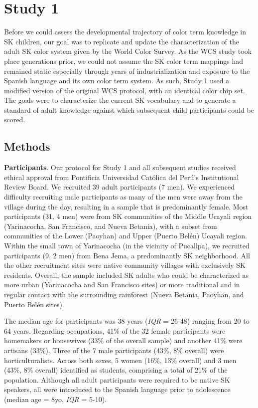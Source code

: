 \documentclass[
  english,
  ,man,floatsintext]{apa6}
\begin{document}
\hypertarget{study-1}{%
\section{Study 1}\label{study-1}}

Before we could assess the developmental trajectory of color term knowledge in SK children, our goal was to replicate and update the characterization of the adult SK color system given by the World Color Survey. As the WCS study took place generations prior, we could not assume the SK color term mappings had remained static especially through years of industrialization and exposure to the Spanish language and its own color term system. As such, Study 1 used a modified version of the original WCS protocol, with an identical color chip set. The goals were to characterize the current SK vocabulary and to generate a standard of adult knowledge against which subsequent child participants could be scored.

\hypertarget{methods}{%
\subsection{Methods}\label{methods}}

\textbf{Participants}. Our protocol for Study 1 and all subsequent studies received ethical approval from Pontificia Universidad Católica del Perú's Institutional Review Board. We recruited 39 adult participants (7 men). We experienced difficulty recruiting male participants as many of the men were away from the village during the day, resulting in a sample that is predominantly female. Most participants (31, 4 men) were from SK communities of the Middle Ucayali region (Yarinacocha, San Francisco, and Nueva Betania), with a subset from communities of the Lower (Paoyhan) and Upper (Puerto Belén) Ucayali region. Within the small town of Yarinacocha (in the vicinity of Pucallpa), we recruited participants (9, 2 men) from Bena Jema, a predominantly SK neighborhood. All the other recruitment sites were native community villages with exclusively SK residents. Overall, the sample included SK adults who could be characterized as more urban (Yarinacocha and San Francisco sites) or more traditional and in regular contact with the surrounding rainforest (Nueva Betania, Paoyhan, and Puerto Belén sites).

The median age for participants was 38 years (\emph{IQR} = 26-48) ranging from 20 to 64 years. Regarding occupations, 41\% of the 32 female participants were homemakers or housewives (33\% of the overall sample) and another 41\% were artisans (33\%). Three of the 7 male participants (43\%, 8\% overall) were horticulturalists. Across both sexes, 5 women (16\%, 13\% overall) and 3 men (43\%, 8\% overall) identified as students, comprising a total of 21\% of the population. Although all adult participants were required to be native SK speakers, all were introduced to the Spanish language prior to adolescence (median age = 8yo, \emph{IQR} = 5-10).
\end{document}
